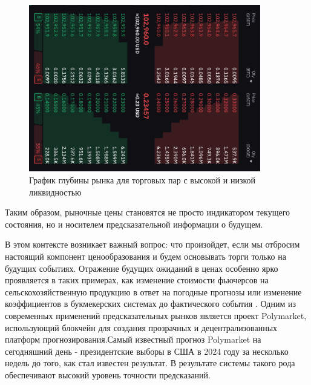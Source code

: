 \documentclass[
    14pt,
    specialist,
    candidate, %
    subf, %
    href,
    dotsinheaders=false
]{disser}
\begin{document}
\begin{figure}[h]
  \centering
  \includegraphics[width=0.9\textwidth]{./assets/limit-order.png}
  \caption{График глубины рынка для торговых пар с высокой и низкой ликвидностью}
  \label{fig:limit-order}
\end{figure}

Таким образом, рыночные цены становятся не просто индикатором текущего состояния, но и носителем предсказательной информации о будущем.

В этом контексте возникает важный вопрос: что произойдет, если мы отбросим настоящий компонент ценообразования и будем основывать торги только на будущих событиях. Отражение будущих ожиданий в ценах особенно ярко проявляется в таких примерах, как изменение стоимости фьючерсов на сельскохозяйственную продукцию в ответ на погодные прогнозы или изменение коэффициентов в букмекерских системах до фактического события \cite{wolfers2019price}. Одним из современных применений предсказательных рынков является проект Polymarket, использующий блокчейн для создания прозрачных и децентрализованных платформ прогнозирования.Самый известный прогноз Polymarket на сегодняшний день - президентские выборы в США в 2024 году за несколько недель до того, как стал известен результат. В результате системы такого рода обеспечивают высокий уровень точности предсказаний.
\end{document}
